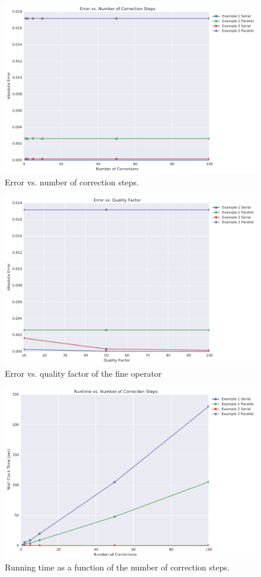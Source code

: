 \documentclass[letterpaper,12pt]{article}
\begin{document}
\begin{figure}
\begin{center}
\includegraphics[width=0.75\linewidth]{data/error_vs_corrections.pdf}
\caption{Error vs. number of correction steps.}
\label{fig:err_v_k}
\end{center}
\end{figure}

\begin{figure}
\begin{center}
\includegraphics[width=0.75\linewidth]{data/error_vs_qualityfactor.pdf}
\caption{Error vs. quality factor of the fine operator}
\label{fig:err_v_q}
\end{center}
\end{figure}

\begin{figure}
\begin{center}
\includegraphics[width=0.75\linewidth]{data/runtime_vs_corrections.pdf}
\caption{Running time as a function of the number of correction steps.}
\label{fig:run_v_k}
\end{center}
\end{figure}
\end{document}
